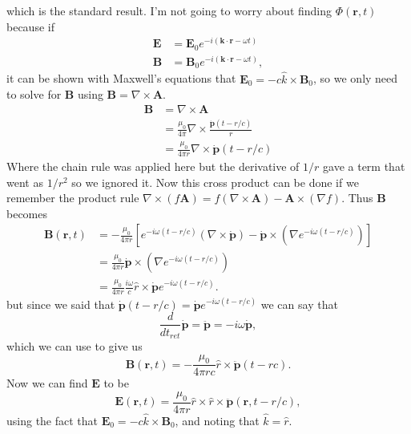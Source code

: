 \documentclass[12pt]{article}
\newcommand{\br}{\mathbf{r}}
\newcommand{\pd}{\dot{\mathbf{p}}}
\newcommand{\pdd}{\ddot{\mathbf{p}}}
\begin{document}
which is the standard result. I'm not going to worry about finding $\Phi(\br,t)$ because if
\begin{align}
   \mathbf{E} &= \mathbf{E}_0e^{-i(\mathbf{k}\cdot\br - \omega t)} \\
   \mathbf{B} &= \mathbf{B}_0e^{-i(\mathbf{k}\cdot\br - \omega t)},
\end{align}
it can be shown with Maxwell's equations that $\mathbf{E}_0 = -c \hat{k}\times\mathbf{B}_0$, so we only need to solve for $\mathbf{B}$ using $\mathbf{B} = \nabla\times\mathbf{A}$.
\begin{align}
   \mathbf{B} &= \nabla\times\mathbf{A} \\
   &= \frac{\mu_0}{4\pi} \nabla\times\frac{\pd(t-r/c)}{r} \\
   &= \frac{\mu_0}{4\pi r} \nabla\times\pd(t-r/c)
\end{align}
Where the chain rule was applied here but the derivative of $1/r$ gave a term that went as $1/r^2$ so we ignored it. Now this cross product can be done if we remember the product rule $\nabla\times(f\mathbf{A}) = f(\nabla\times\mathbf{A}) - \mathbf{A}\times(\nabla f)$. Thus $\mathbf{B}$ becomes
\begin{align}
   \mathbf{B}(\br,t) &= -\frac{\mu_0}{4\pi r}\left[e^{-i\omega(t-r/c)}(\nabla\times\pd) - \pd\times(\nabla e^{-i\omega(t-r/c)}) \right] \\
   &= \frac{\mu_0}{4\pi r} \pd\times(\nabla e^{-i\omega(t-r/c)}) \\
   &= \frac{\mu_0}{4\pi r} \frac{i\omega}{c}\hat{r}\times\pd e^{-i\omega(t-r/c)}.
\end{align}
but since we said that $\pd(t-r/c) = \pd e^{-i\omega(t-r/c)}$ we can say that
\begin{equation}
   \frac{d}{dt_{ret}}\pd = \pdd = -i\omega\pd,
\end{equation}
which we can use to give us
\begin{equation}
   \mathbf{B}(\br,t) = -\frac{\mu_0}{4\pi rc}\hat{r}\times\pdd(t-rc).
\end{equation}
Now we can find $\mathbf{E}$ to be
\begin{equation}
   \mathbf{E}(\br,t) = \frac{\mu_0}{4\pi r} \hat{r}\times\hat{r}\times\pdd(\br,t-r/c),
\end{equation}
using the fact that $\mathbf{E}_0 = -c \hat{k}\times\mathbf{B}_0$, and noting that $\hat{k}=\hat{r}$.
\end{document}
